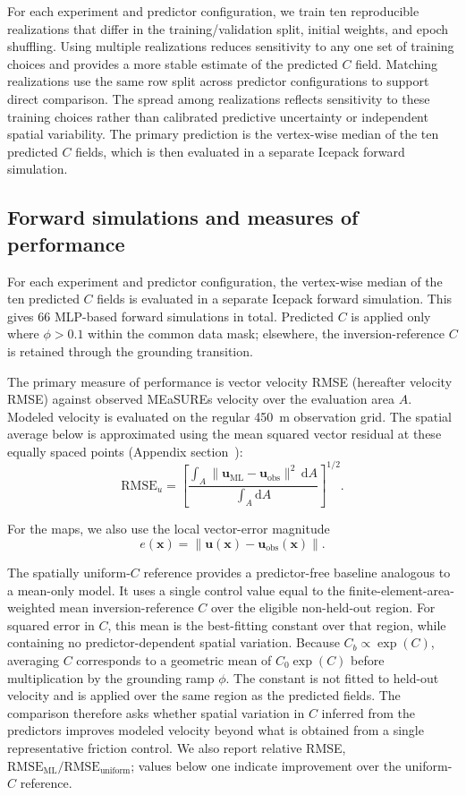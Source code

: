 \documentclass[review,jog]{igs}
\begin{document}
For each experiment and predictor configuration, we train ten reproducible
realizations that differ in the training/validation split, initial weights, and
epoch shuffling. Using multiple realizations reduces sensitivity to any one
set of training choices and provides a more stable estimate of the predicted
$C$ field. Matching realizations use the same row split across predictor
configurations to support direct comparison. The spread among realizations
reflects sensitivity to these training choices rather than calibrated predictive
uncertainty or independent spatial variability. The primary prediction is the
vertex-wise median of the ten predicted $C$ fields, which is then evaluated in
a separate Icepack forward simulation.

\subsection{Forward simulations and measures of performance}

For each experiment and predictor configuration, the vertex-wise median of
the ten predicted $C$ fields is evaluated in a separate Icepack forward
simulation. This gives 66 MLP-based forward simulations in total. Predicted
$C$ is applied only where $\phi>0.1$ within the common data mask; elsewhere,
the inversion-reference $C$ is retained through the grounding transition.

The primary measure of performance is vector velocity RMSE (hereafter velocity RMSE) against observed MEaSUREs velocity over the evaluation area $A$. Modeled velocity is evaluated on the regular 450~m observation grid. The spatial average below is approximated using the mean squared vector residual at these equally spaced points (Appendix section~):
\begin{equation}
\label{eq:vector_rmse}
\mathrm{RMSE}_{u}=
\left[
\frac{
\int_A
\lVert\mathbf{u}_{\mathrm{ML}}-\mathbf{u}_{\mathrm{obs}}\rVert^2
\,\mathrm{d}A
}{
\int_A \mathrm{d}A
}
\right]^{1/2}.
\end{equation}

For the maps, we also use the local vector-error magnitude
\[
e(\mathbf{x}) =
\left\|\mathbf{u}(\mathbf{x})-\mathbf{u}_{\mathrm{obs}}(\mathbf{x})\right\|.
\]

The spatially uniform-$C$ reference provides a predictor-free baseline
analogous to a mean-only model. It uses a single control value equal to the
finite-element-area-weighted mean inversion-reference $C$ over the eligible
non-held-out region. For squared error in $C$, this mean is the best-fitting
constant over that region, while containing no predictor-dependent spatial
variation. Because $C_b\propto\exp(C)$, averaging $C$ corresponds to a
geometric mean of $C_0\exp(C)$ before multiplication by the grounding ramp
$\phi$. The constant is not fitted to held-out velocity and is applied over
the same region as the predicted fields. The comparison therefore asks whether spatial variation in $C$ inferred from the predictors improves modeled velocity beyond what is obtained from a single representative friction control. We also report relative RMSE,
$\mathrm{RMSE}_{\mathrm{ML}}/\mathrm{RMSE}_{\mathrm{uniform}}$; values below
one indicate improvement over the uniform-$C$ reference.
\end{document}
